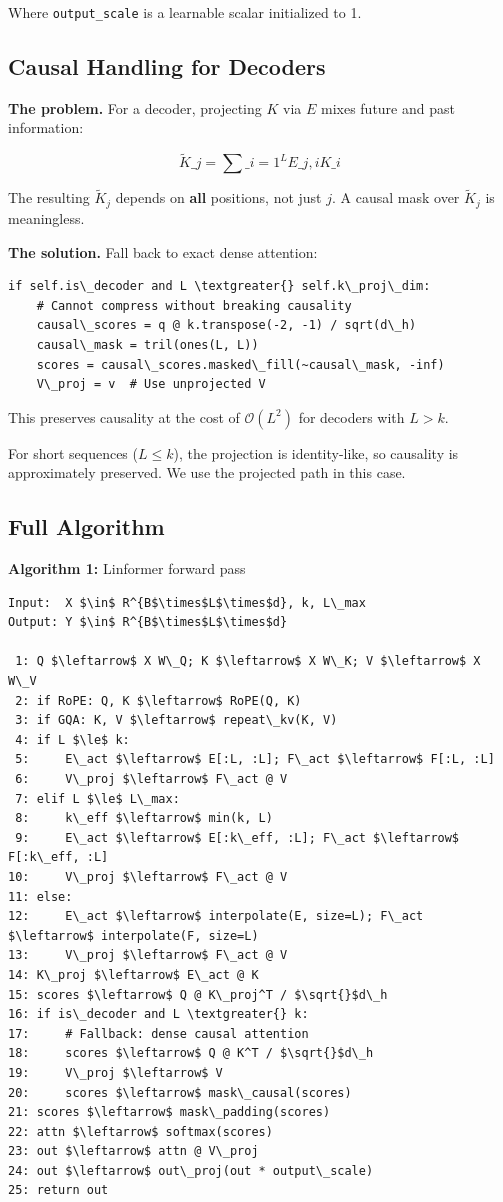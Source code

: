 Where \texttt{output\_scale} is a learnable scalar initialized to 1.

\subsection{Causal Handling for Decoders}

\textbf{The problem.} For a decoder, projecting $K$ via $E$ mixes future and past 
information:

\[
\tilde{K}\_j = \sum\_{i=1}^L E\_{j, i} K\_i
\tag{4.3}
\]

The resulting $\tilde{K}_j$ depends on \textbf{all} positions, not just $j$. A 
causal mask over $\tilde{K}_j$ is meaningless.

\textbf{The solution.} Fall back to exact dense attention:

\begin{lstlisting}
if self.is\_decoder and L \textgreater{} self.k\_proj\_dim:
    # Cannot compress without breaking causality
    causal\_scores = q @ k.transpose(-2, -1) / sqrt(d\_h)
    causal\_mask = tril(ones(L, L))
    scores = causal\_scores.masked\_fill(~causal\_mask, -inf)
    V\_proj = v  # Use unprojected V
\end{lstlisting}

This preserves causality at the cost of $\mathcal{O}(L^2)$ for decoders 
with $L > k$.

For short sequences ($L \leq k$), the projection is identity-like, so 
causality is approximately preserved. We use the projected path in this 
case.

\subsection{Full Algorithm}

\textbf{Algorithm 1:} Linformer forward pass
\begin{lstlisting}
Input:  X $\in$ R^{B$\times$L$\times$d}, k, L\_max
Output: Y $\in$ R^{B$\times$L$\times$d}

 1: Q $\leftarrow$ X W\_Q; K $\leftarrow$ X W\_K; V $\leftarrow$ X W\_V
 2: if RoPE: Q, K $\leftarrow$ RoPE(Q, K)
 3: if GQA: K, V $\leftarrow$ repeat\_kv(K, V)
 4: if L $\le$ k:
 5:     E\_act $\leftarrow$ E[:L, :L]; F\_act $\leftarrow$ F[:L, :L]
 6:     V\_proj $\leftarrow$ F\_act @ V
 7: elif L $\le$ L\_max:
 8:     k\_eff $\leftarrow$ min(k, L)
 9:     E\_act $\leftarrow$ E[:k\_eff, :L]; F\_act $\leftarrow$ F[:k\_eff, :L]
10:     V\_proj $\leftarrow$ F\_act @ V
11: else:
12:     E\_act $\leftarrow$ interpolate(E, size=L); F\_act $\leftarrow$ interpolate(F, size=L)
13:     V\_proj $\leftarrow$ F\_act @ V
14: K\_proj $\leftarrow$ E\_act @ K
15: scores $\leftarrow$ Q @ K\_proj^T / $\sqrt{}$d\_h
16: if is\_decoder and L \textgreater{} k:
17:     # Fallback: dense causal attention
18:     scores $\leftarrow$ Q @ K^T / $\sqrt{}$d\_h
19:     V\_proj $\leftarrow$ V
20:     scores $\leftarrow$ mask\_causal(scores)
21: scores $\leftarrow$ mask\_padding(scores)
22: attn $\leftarrow$ softmax(scores)
23: out $\leftarrow$ attn @ V\_proj
24: out $\leftarrow$ out\_proj(out * output\_scale)
25: return out
\end{lstlisting}

